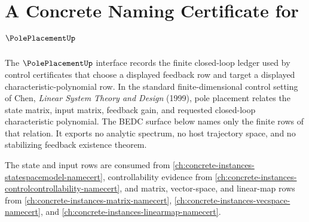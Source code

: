 \chapter{A Concrete Naming Certificate for $\PolePlacementUp$}
\label{ch:concrete-instances-poleplacement-namecert}

The $\PolePlacementUp$ interface records the finite closed-loop ledger used by
control certificates that choose a displayed feedback row and target a
displayed characteristic-polynomial row. In the standard finite-dimensional
control setting of Chen, \emph{Linear System Theory and Design} (1999), pole
placement relates the state matrix, input matrix, feedback gain, and requested
closed-loop characteristic polynomial. The BEDC surface below names only the
finite rows of that relation. It exports no analytic spectrum, no host
trajectory space, and no stabilizing feedback existence theorem.

The state and input rows are consumed from \autoref{ch:concrete-instances-statespacemodel-namecert}, controllability evidence from \autoref{ch:concrete-instances-controlcontrollability-namecert}, and matrix, vector-space, and linear-map rows from \autoref{ch:concrete-instances-matrix-namecert}, \autoref{ch:concrete-instances-vecspace-namecert}, and \autoref{ch:concrete-instances-linearmap-namecert}.


